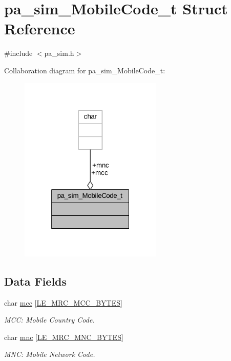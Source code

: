 \hypertarget{structpa__sim___mobile_code__t}{}\section{pa\+\_\+sim\+\_\+\+Mobile\+Code\+\_\+t Struct Reference}
\label{structpa__sim___mobile_code__t}


{\ttfamily \#include $<$pa\+\_\+sim.\+h$>$}



Collaboration diagram for pa\+\_\+sim\+\_\+\+Mobile\+Code\+\_\+t\+:
\nopagebreak
\begin{figure}[H]
\begin{center}
\leavevmode
\includegraphics[width=193pt]{structpa__sim___mobile_code__t__coll__graph}
\end{center}
\end{figure}
\subsection*{Data Fields}
\begin{DoxyCompactItemize}
\item 
char \hyperlink{structpa__sim___mobile_code__t_ab5524fbf25b11fe28b8e47e30ad38edf}{mcc} \mbox{[}\hyperlink{le__mrc__interface_8h_aec88b97b54a45f86e6cb34f65b2d0afd}{L\+E\+\_\+\+M\+R\+C\+\_\+\+M\+C\+C\+\_\+\+B\+Y\+T\+ES}\mbox{]}
\begin{DoxyCompactList}\small\item\em M\+CC\+: Mobile Country Code. \end{DoxyCompactList}\item 
char \hyperlink{structpa__sim___mobile_code__t_a151d28fcde13a9b0bb587718d1d27986}{mnc} \mbox{[}\hyperlink{le__mrc__interface_8h_aeae0e240c77730be724ad7ac42596469}{L\+E\+\_\+\+M\+R\+C\+\_\+\+M\+N\+C\+\_\+\+B\+Y\+T\+ES}\mbox{]}
\begin{DoxyCompactList}\small\item\em M\+NC\+: Mobile Network Code. \end{DoxyCompactList}\end{DoxyCompactItemize}


